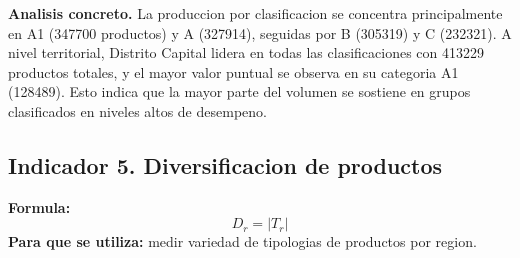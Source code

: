 \documentclass[12pt,letterpaper]{article}
\begin{document}
\textbf{Analisis concreto.} La produccion por clasificacion se concentra principalmente en A1 (347700 productos) y A (327914), seguidas por B (305319) y C (232321). A nivel territorial, Distrito Capital lidera en todas las clasificaciones con 413229 productos totales, y el mayor valor puntual se observa en su categoria A1 (128489). Esto indica que la mayor parte del volumen se sostiene en grupos clasificados en niveles altos de desempeno.


\subsection{Indicador 5. Diversificacion de productos}
\textbf{Formula:}
\[
D_r = |T_r|
\]
\textbf{Para que se utiliza:} medir variedad de tipologias de productos por region.



\renewcommand{\arraystretch}{1.2}
\setlength{\LTleft}{0pt}
\setlength{\LTright}{0pt}

\small
\end{document}
